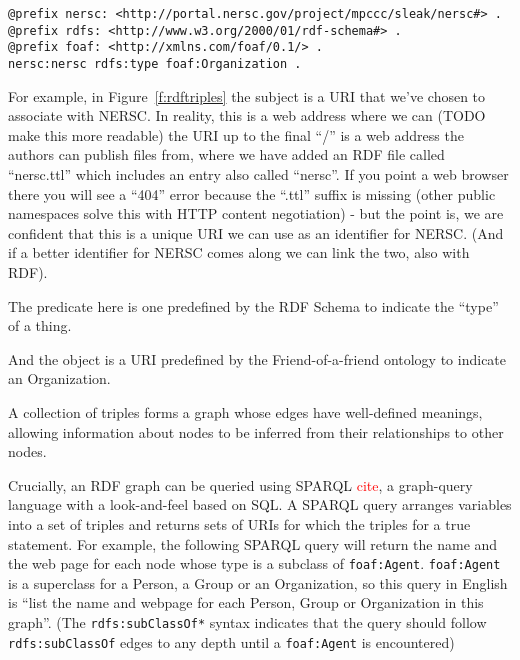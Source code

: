 \begin{figure*}
\begin{verbatim}
@prefix nersc: <http://portal.nersc.gov/project/mpccc/sleak/nersc#> .
@prefix rdfs: <http://www.w3.org/2000/01/rdf-schema#> .
@prefix foaf: <http://xmlns.com/foaf/0.1/> .
nersc:nersc rdfs:type foaf:Organization .
\end{verbatim}

\caption{A triple of (subject, predicate, object) describes an edge 
in an RDF graph. The \texttt{Turtle}\textcolor{red}{cite} syntax shown
here aids human readability by condensing URIs into a prefix and a suffix,
so \texttt{rdfs:type} expands as
\texttt{<http://www.w3.org/2000/01/rdf-schema\#type>}.}
\label{f:rdftriples}
\end{figure*}

For example, in Figure~\ref{f:rdftriples} the subject is a URI that 
we've chosen to associate with NERSC. In reality, this is a web address where we can 
(TODO make this more readable)
the URI up to the final ``/'' is a web address the authors
can publish files from, where we have added an RDF file called ``nersc.ttl'' 
which includes an entry also called ``nersc''. If you point a web browser 
there you will see a ``404'' error because the ``.ttl'' suffix is missing 
(other public namespaces solve this with HTTP content negotiation) - but the 
point is, we are confident that this is a unique URI we can use as an 
identifier for NERSC. (And if a better identifier for NERSC comes along 
we can link the two, also with RDF).

The predicate here is one predefined by the RDF Schema to indicate the ``type''
of a thing.

And the object is a URI predefined by the Friend-of-a-friend ontology to
indicate an Organization.

A collection of triples forms a graph whose edges have well-defined meanings, 
allowing information about nodes to be inferred from their relationships to 
other nodes.

Crucially, an RDF graph can be queried using SPARQL \textcolor{red}{cite}, a
graph-query language with a look-and-feel based on SQL. A SPARQL query 
arranges variables into a set of triples and returns sets of URIs for which
the triples for a true statement. For example, the following SPARQL query
will return the name and the web page for each node whose type is 
a subclass of \texttt{foaf:Agent}. \texttt{foaf:Agent} is a superclass for a Person, a 
Group or an Organization, so this query in English is ``list the name and 
webpage for each Person, Group or Organization in this graph''. (The 
\texttt{rdfs:subClassOf*} syntax indicates that the query should follow 
\texttt{rdfs:subClassOf} edges to any depth until a \texttt{foaf:Agent} is encountered)

